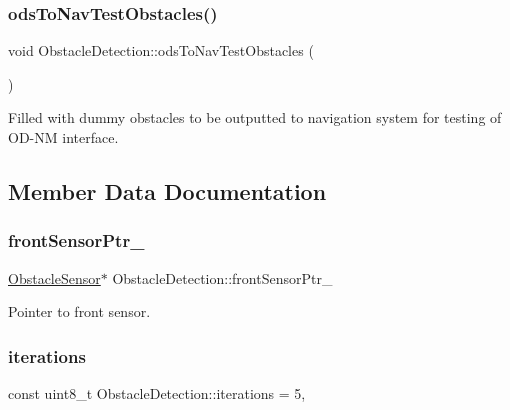 \subsubsection{\texorpdfstring{ods\+To\+Nav\+Test\+Obstacles()}{odsToNavTestObstacles()}}
{\footnotesize\ttfamily void Obstacle\+Detection\+::ods\+To\+Nav\+Test\+Obstacles (\begin{DoxyParamCaption}{ }\end{DoxyParamCaption})}



Filled with dummy obstacles to be outputted to navigation system for testing of O\+D-\/\+NM interface. 



\subsection{Member Data Documentation}
\mbox{\label{class_obstacle_detection_ab6e8507df02f3b6d9282d0253ac338f3}} 
\subsubsection{\texorpdfstring{front\+Sensor\+Ptr\+\_\+}{frontSensorPtr\_}}
{\footnotesize\ttfamily \mbox{\hyperlink{class_obstacle_sensor}{Obstacle\+Sensor}}$\ast$ Obstacle\+Detection\+::front\+Sensor\+Ptr\+\_\+\hspace{0.3cm}{\ttfamily [private]}}



Pointer to front sensor. 

\mbox{\label{class_obstacle_detection_a37811b168a642890429f6752118341cc}} 
\subsubsection{\texorpdfstring{iterations}{iterations}}
{\footnotesize\ttfamily const uint8\+\_\+t Obstacle\+Detection\+::iterations = 5\hspace{0.3cm}{\ttfamily [static]}, {\ttfamily [private]}}



